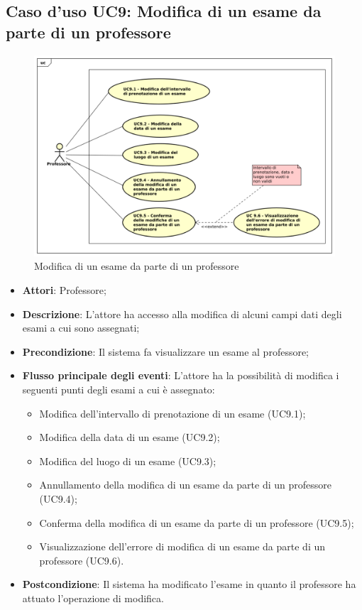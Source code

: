\subsection{Caso d'uso \texorpdfstring{UC9}{UC9}: Modifica di un esame da parte di un professore}
\begin{figure} [H]
	\centering
	\includegraphics[scale=0.45]{./img/UC9.pdf}
	\caption{Modifica di un esame da parte di un professore}\label{}
\end{figure}
\begin{itemize}
	\item \textbf{Attori}: Professore;
	\item \textbf{Descrizione}: L'attore ha accesso alla modifica di alcuni campi dati degli esami a cui sono assegnati;
	\item \textbf{Precondizione}: Il sistema fa visualizzare un esame al professore;
	
	\item \textbf{Flusso principale degli eventi}: L'attore ha la possibilità di modifica i seguenti punti degli esami a cui è assegnato:
	\begin{itemize}
		\item Modifica dell'intervallo di prenotazione di un esame (UC9.1);
		\item Modifica della data di un esame (UC9.2);
		\item Modifica del luogo di un esame (UC9.3);
		\item Annullamento della modifica di un esame da parte di un professore (UC9.4);
		\item Conferma della modifica di un esame da parte di un professore (UC9.5);
		\item Visualizzazione dell'errore di modifica di un esame da parte di un professore (UC9.6).
	\end{itemize}
	\item \textbf{Postcondizione}: Il sistema ha modificato l'esame in quanto il professore ha attuato l'operazione di modifica.
	
\end{itemize}
